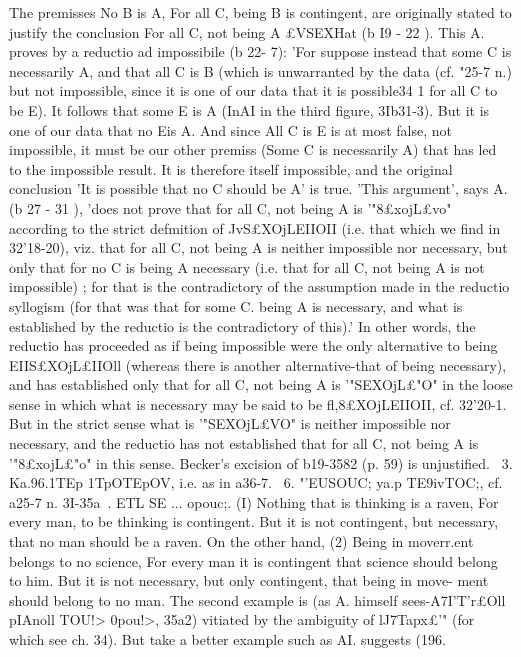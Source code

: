 {{{{{The premisses No B is A, For all C, being B is contingent, are
originally stated to justify the conclusion For all C, not being A
£VSEXHat (b I9 - 22 ). This A. proves by a reductio ad impossibile
(b 22- 7): 'For suppose instead that some C is necessarily A, and
that all C is B (which is unwarranted by the data (cf. "25-7 n.)
but not impossible, since it is one of our data that it is possible34 1
for all C to be E). It follows that some E is A (InAI in the third
figure, 3Ib31-3). But it is one of our data that no Eis A. And
since All C is E is at most false, not impossible, it must be our
other premiss (Some C is necessarily A) that has led to the
impossible result. It is therefore itself impossible, and the original
conclusion 'It is possible that no C should be A' is true.
'This argument', says A. (b 27 - 31 ), 'does not prove that for all
C, not being A is '"8£xojL£vo" according to the strict defmition of
JvS£XOjLEIIOII (i.e. that which we find in 32'18-20), viz. that for all
C, not being A is neither impossible nor necessary, but only that
for no C is being A necessary (i.e. that for all C, not being A is
not impossible) ; for that is the contradictory of the assumption
made in the reductio syllogism (for that was that for some C.
being A is necessary, and what is established by the reductio is
the contradictory of this).' In other words, the reductio has
proceeded as if being impossible were the only alternative to being
EIIS£XOjL£IIOll (whereas there is another alternative-that of being
necessary), and has established only that for all C, not being A
is '"SEXOjL£"O" in the loose sense in which what is necessary may
be said to be fl,8£XOjLEIIOII, cf. 32'20-1. But in the strict sense what
is '"SEXOjL£VO" is neither impossible nor necessary, and the reductio
has not established that for all C, not being A is '"8£xojL£"o" in
this sense. Becker's excision of b19-3582 (p. 59) is unjustified.
~3. Ka.96.1TEp 1TpOTEpOV, i.e. as in a36-7.
~6. "'EUSOUC; ya.p TE9ivTOC;, cf. a25-7 n.
3I-35a~. ETL SE ... opouc;. (I) Nothing that is thinking is a
raven, For every man, to be thinking is contingent. But it is not
contingent, but necessary, that no man should be a raven. On
the other hand, (2) Being in moverr.ent belongs to no science, For
every man it is contingent that science should belong to him.
But it is not necessary, but only contingent, that being in move-
ment should belong to no man.
The second example is (as A. himself sees-A7I'T'r£Oll pIAnoll TOU!>
0pou!>, 35a2) vitiated by the ambiguity of lJ7Tapx£'" (for which see
ch. 34). But take a better example such as AI. suggests (196.
}}}}}
